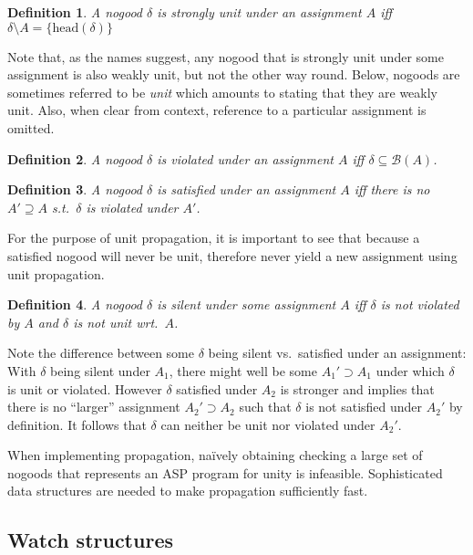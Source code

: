 \documentclass{vutinfth} %
\newtheorem{definition}{Definition}[section]
\newcommand{\bass}{\mathcal{B}}
\newcommand{\ass}{A}
\newcommand{\upinv}{silent\xspace}
\newcommand{\headf}{\mathrm{head}}
\begin{document}
\begin{definition}
A nogood $\delta$ is \emph{strongly unit} under an assignment $\ass$ iff $\delta \setminus \ass = \{ \headf(\delta) \}$
\end{definition}

Note that, as the names suggest, any nogood that is strongly unit under some assignment is also weakly unit, but not the other way round. Below, nogoods are sometimes referred to be \emph{unit} which amounts to stating that they are weakly unit. Also, when clear from context, reference to a particular assignment is omitted.

\begin{definition}
\label{def:vio}
A nogood $\delta$ is \emph{violated} under an assignment $\ass$ iff $\delta \subseteq \bass(\ass)$.
\end{definition}

\begin{definition}
A nogood $\delta$ is \emph{satisfied} under an assignment $\ass$ iff there is no $\ass' \supseteq \ass$ s.t.~$\delta$ is violated under $\ass'$.
\end{definition}

For the purpose of unit propagation, it is important to see that because a satisfied nogood will never be unit, therefore never yield a new assignment using unit propagation.

\begin{definition}
A nogood $\delta$ is \emph{\upinv} under some assignment $\ass$ iff $\delta$ is not violated by $\ass$ and $\delta$ is not unit wrt.~$\ass$.
\end{definition}

Note the difference between some $\delta$ being \upinv vs.~satisfied under an assignment: With $\delta$ being \upinv under $\ass_1$, there might well be some $\ass_1' \supset \ass_1$ under which $\delta$ is unit or violated. However $\delta$ satisfied under $\ass_2$ is stronger and implies that there is no \enquote{larger} assignment $\ass_2' \supset \ass_2$ such that $\delta$ is not satisfied under $\ass_2'$ by definition. It follows that $\delta$ can neither be unit nor violated under $\ass_2'$.

When implementing propagation, na{\"i}vely obtaining checking a large set of nogoods that represents an ASP program for unity is infeasible. Sophisticated data structures are needed to make propagation sufficiently fast.

\subsection{Watch structures}
\end{document}
